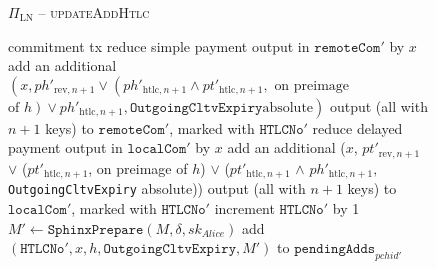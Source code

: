 \begin{figure}[H]
\begin{protocolbox}{$\Pi_{\mathrm{LN}}$ -- \textsc{updateAddHtlc}}
\begin{algorithmic}[1]
            commitment tx
            \State reduce simple payment output in $\mathtt{remoteCom}'$ by $x$
            \State add an additional $\left(x, ph'_{\mathrm{rev}, n+1} \vee
            \left(ph'_{\mathrm{htlc}, n+1} \wedge pt'_{\mathrm{htlc}, n+1},
            \text{ on preimage}\right.\right.$ $\left.\left.\text{of } h\right)
            \vee ph'_{\mathrm{htlc}, n+1}, \mathtt{OutgoingCltvExpiry} \text{
            absolute}\right)$ output (all with $n+1$ keys) to
            $\mathtt{remoteCom}'$, marked with $\texttt{HTLCNo}'$
            \State reduce delayed payment output in $\mathtt{localCom}'$ by $x$
            \State add an additional ($x$, $pt'_{\mathrm{rev}, n+1}$ $\vee$
            ($pt'_{\mathrm{htlc}, n+1}$, on preimage of $h$) $\vee$
            ($pt'_{\mathrm{htlc}, n+1}$ $\wedge$ $ph'_{\mathrm{htlc}, n+1},$
            \texttt{OutgoingCltvExpiry} absolute)) output (all with $n+1$ keys)
            to $\mathtt{localCom}'$, marked with $\texttt{HTLCNo}'$
            \State increment $\texttt{HTLCNo}'$ by 1
            \State $M' \gets \mathtt{SphinxPrepare}\left(M, \delta,
            sk_{\mathit{Alice}}\right)$
            \State add $\left(\mathtt{HTLCNo}', x, h,
            \mathtt{OutgoingCltvExpiry}, M'\right)$ to
            $\mathtt{pendingAdds}_{\mathit{pchid}'}$
          \EndIf
        \EndIndent
      \end{algorithmic}
    \end{protocolbox}
    \caption{}
    \label{alg:protocol:pay:updateAddHtlc}
  \end{figure}

